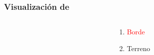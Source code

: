 \begin{frame}
 \frametitle{Visualización de \LARGE{}}
\begin{columns}
  \begin{column}{0.7\textwidth}
    \begin{center}
   \end{center}
  \end{column}
  \begin{column}{0.25\textwidth}
	\begin{enumerate}
	 \item \textcolor{red}{Borde}
	 \item \textcolor{yellow!95!black}{Terreno}
	\end{enumerate}
  \end{column}
\end{columns}
\end{frame}
